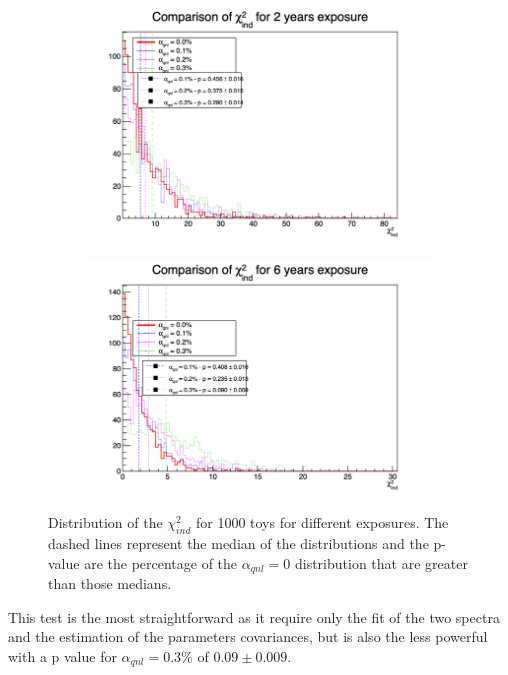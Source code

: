 \documentclass[../main.tex]{subfiles}
\begin{document}
\begin{figure}[th]
  \begin{subfigure}[t]{0.48\linewidth}
    \includegraphics[width=\linewidth]{images/joint_fit/stat_tests/chi2_ind_2y.png}
  \end{subfigure}
  \begin{subfigure}[t]{0.48\linewidth}
    \includegraphics[width=\linewidth]{images/joint_fit/stat_tests/chi2_ind_6y.png}
  \end{subfigure}
  \caption{Distribution of the $\chi^2_{ind}$ for 1000 toys for different exposures. The dashed lines represent the median of the distributions and the p-value are the percentage of the $\alpha_{qnl} = 0$ distribution that are greater than those medians.}
  \label{fig:joint_fit:chi2_ind}
\end{figure}

This test is the most straightforward as it require only the fit of the two spectra and the estimation of the parameters covariances, but is also the less powerful with a p value for $\alpha_{qnl} = 0.3\%$ of $0.09 \pm 0.009$.
\end{document}
